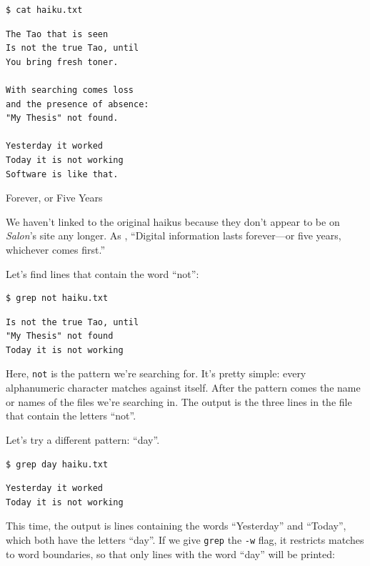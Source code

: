 \documentclass{book}
\begin{document}
\begin{verbatim}
$ cat haiku.txt
\end{verbatim}

\begin{verbatim}
The Tao that is seen
Is not the true Tao, until
You bring fresh toner.

With searching comes loss
and the presence of absence:
"My Thesis" not found.

Yesterday it worked
Today it is not working
Software is like that.
\end{verbatim}

\begin{swcbox}{Forever, or Five Years}

We haven't linked to the original haikus because they don't appear to be
on \emph{Salon}'s site any longer. As
, ``Digital information lasts forever---or five years, whichever
comes first.''

\end{swcbox}

Let's find lines that contain the word ``not'':

\begin{verbatim}
$ grep not haiku.txt
\end{verbatim}

\begin{verbatim}
Is not the true Tao, until
"My Thesis" not found
Today it is not working
\end{verbatim}

Here, \texttt{not} is the pattern we're searching for. It's pretty
simple: every alphanumeric character matches against itself. After the
pattern comes the name or names of the files we're searching in. The
output is the three lines in the file that contain the letters ``not''.

Let's try a different pattern: ``day''.

\begin{verbatim}
$ grep day haiku.txt
\end{verbatim}

\begin{verbatim}
Yesterday it worked
Today it is not working
\end{verbatim}

This time, the output is lines containing the words ``Yesterday'' and
``Today'', which both have the letters ``day''. If we give \texttt{grep}
the \texttt{-w} flag, it restricts matches to word boundaries, so that
only lines with the word ``day'' will be printed:
\end{document}
